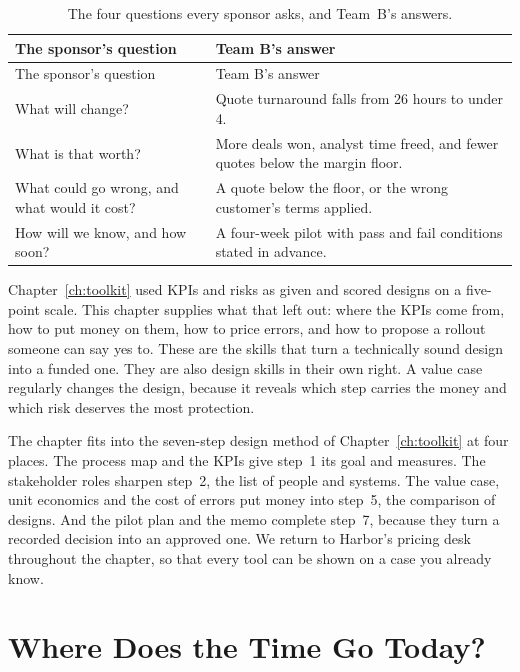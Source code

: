 \begingroup
\small
\begin{xltabular}{\textwidth}{@{}>{\raggedright\arraybackslash}p{5.4cm}>{\raggedright\arraybackslash}X@{}}
\caption{The four questions every sponsor asks, and Team~B's answers.}\label{tab:four-questions}\\
\toprule
{} The sponsor's question & Team B's answer \\
\midrule
\endfirsthead
\toprule
{} The sponsor's question & Team B's answer \\
\midrule
\endhead
{} What will change? & Quote turnaround falls from 26 hours to under 4. \\
 What is that worth? & More deals won, analyst time freed, and fewer quotes below the margin floor. \\
 What could go wrong, and what would it cost? & A quote below the floor, or the wrong customer's terms applied. \\
 How will we know, and how soon? & A four-week pilot with pass and fail conditions stated in advance. \\
\bottomrule
\end{xltabular}
\endgroup

Chapter~\ref{ch:toolkit} used KPIs and risks as given and scored designs on a five-point scale. This chapter supplies what that left out: where the KPIs come from, how to put money on them, how to price errors, and how to propose a rollout someone can say yes to. These are the skills that turn a technically sound design into a funded one. They are also design skills in their own right. A value case regularly changes the design, because it reveals which step carries the money and which risk deserves the most protection.

The chapter fits into the seven-step design method of Chapter~\ref{ch:toolkit} at four places. The process map and the KPIs give step~1 its goal and measures. The stakeholder roles sharpen step~2, the list of people and systems. The value case, unit economics and the cost of errors put money into step~5, the comparison of designs. And the pilot plan and the memo complete step~7, because they turn a recorded decision into an approved one. We return to Harbor's pricing desk throughout the chapter, so that every tool can be shown on a case you already know.

\section{Where Does the Time Go Today?}
\label{sec:process-map}

